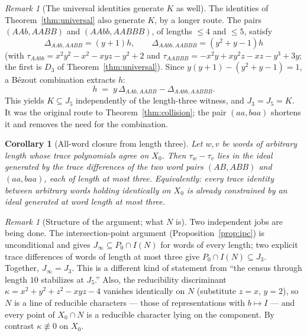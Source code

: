 \documentclass[11pt,a4paper]{article}
\newtheorem{corollary}[theorem]{Corollary}
\theoremstyle{definition}
\theoremstyle{remark}
\newtheorem{remark}[theorem]{Remark}
\begin{document}
\begin{remark}[The universal identities generate $K$ as well]
\label{rem:bezout}
The identities of Theorem~\ref{thm:universal} also generate $K$, by a
longer route. The pairs $(AAb,AABB)$ and $(AAbb,AABBB)$, of lengths
$\le4$ and $\le5$, satisfy
\begin{equation}
\Delta_{AAb,AABB}=(y+1)h,\qquad
\Delta_{AAbb,AABBB}=(y^2+y-1)h
\end{equation}
(with $\tau_{AAbb}=x^2y^2-x^2-xyz-y^2+2$ and
$\tau_{AABBB}=-x^2y+xy^2z-xz-y^3+3y$; the first is $D_3$ of
Theorem~\ref{thm:universal}). Since $y(y+1)-(y^2+y-1)=1$, a B\'ezout
combination extracts $h$:
\begin{equation}
h \;=\; y\,\Delta_{AAb,AABB}-\Delta_{AAbb,AABBB}.
\end{equation}
This yields $K\subseteq J_5$ independently of the length-three witness,
and $J_3=J_5=K$. It was the original route to
Theorem~\ref{thm:collision}; the pair $(aa,baa)$ shortens it and removes
the need for the combination.
\end{remark}

\begin{corollary}[All-word closure from length three]
\label{cor:allword}
Let $w,v$ be words of arbitrary length whose trace polynomials agree on
$X_0$. Then $\tau_w - \tau_v$ lies in the ideal generated by the trace
differences of the two word pairs $(AB,ABB)$ and $(aa,baa)$, each of
length at most three. Equivalently: every trace identity between
arbitrary words holding identically on $X_0$ is already constrained by an
ideal generated at word length at most three.
\end{corollary}

\begin{remark}[Structure of the argument; what $N$ is]
\label{rem:structure}
Two independent jobs are being done. The intersection-point argument
(Proposition~\ref{prop:ipc}) is unconditional and gives
$J_\infty\subseteq P_0\cap I(N)$ for words of every length; two
explicit trace differences of words of length at most three give
$P_0\cap I(N)\subseteq J_3$. Together, $J_\infty=J_3$. This is a
different kind of statement from ``the census through length $10$
stabilizes at $J_5$.'' Also, the
reducibility discriminant $\kappa=x^2+y^2+z^2-xyz-4$ vanishes
identically on $N$ (substitute $z=x$, $y=2$), so $N$ is a line of
reducible characters --- those of representations with $b\mapsto I$ ---
and every point of $X_0\cap N$ is a reducible character lying on the
component. By contrast $\kappa\not\equiv0$ on $X_0$.
\end{remark}
\end{document}
